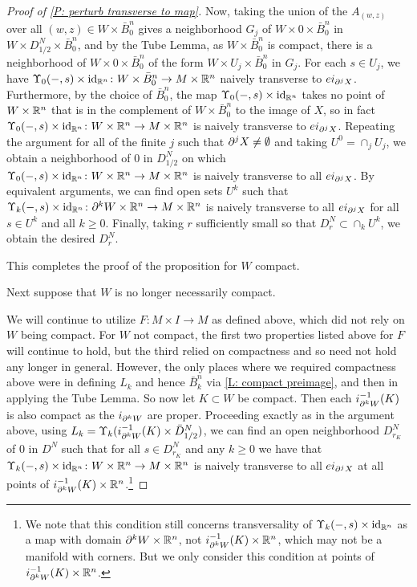 \begin{proof}[Proof of \cref{P: perturb transverse to map}]
	Now, taking the union of the $A_{(w,z)}$ over all $(w,z) \in W \times \bar B^n_0$ gives a neighborhood $G_j$ of $W \times 0 \times \bar B^n_0$ in $W \times D_{1/2}^N \times \bar B^n_0$, and by the Tube Lemma, as $W \times \bar B^n_0$ is compact, there is a neighborhood of $W \times 0 \times \bar B^n_0$ of the form $W \times U_j \times \bar B^n_0$ in $G_j$.
	For each $s \in U_j$, we have $\Upsilon_0(-,s) \times \mathrm{id}_{\mathbb{R}^n} \colon W \times \bar B^n_0 \to M \times \mathbb{R}^n$ naively transverse to $ei_{\partial^jX}$.
	Furthermore, by the choice of $\bar B^n_0$, the map $\Upsilon_0(-,s) \times \mathrm{id}_{\mathbb{R}^n}$ takes no point of $W \times \mathbb{R}^n$ that is in the complement of $W \times \bar B^n_0$ to the image of $X$,
	so in fact $\Upsilon_0(-,s) \times \mathrm{id}_{\mathbb{R}^n} \colon W \times \mathbb{R}^n \to M \times \mathbb{R}^n$ is naively transverse to $ei_{\partial^jX}$.
	Repeating the argument for all of the finite $j$ such that $\partial^jX \neq \emptyset$ and taking $U^0 = \cap_j U_j$, we obtain a neighborhood of $0$ in $D_{1/2}^N$ on which $\Upsilon_0(-,s) \times \mathrm{id}_{\mathbb{R}^n} \colon W \times \mathbb{R}^n \to M \times \mathbb{R}^n$ is naively transverse to all $ei_{\partial^jX}$.
	By equivalent arguments, we can find open sets $U^k$ such that $\Upsilon_k(-,s) \times \mathrm{id}_{\mathbb{R}^n} \colon \partial^k W \times \mathbb{R}^n \to M \times \mathbb{R}^n$ is naively transverse to all $ei_{\partial^jX}$ for all $s \in U^k$ and all $k\geq 0$.
	Finally, taking $r$ sufficiently small so that $D_r^N \subset \cap_k U^k$, we obtain the desired $D_r^N$.

	This completes the proof of the proposition for $W$ compact.

	Next suppose that $W$ is no longer necessarily compact.

	We will continue to utilize $F \colon M \times I \to M$ as defined above, which did not rely on $W$ being compact.
	For $W$ not compact, the first two properties listed above for $F$ will continue to hold, but the third relied on compactness and so need not hold any longer in general.
	However, the only places where we required compactness above were in defining $L_k$ and hence $\bar B^n_k$ via \cref{L: compact preimage}, and then in applying the Tube Lemma.
	So now let $K \subset W$ be compact.
	Then each $i_{\partial^k W}^{-1}(K)$ is also compact as the $i_{\partial^k W}$ are proper.
	Proceeding exactly as in the argument above, using $L_k = \Upsilon_k(i_{\partial^k W}^{-1}(K) \times \bar D^N_{1/2})$, we can find an open neighborhood
	$D_{r_K}^N$ of $0$ in $D^N$ such that for all $s \in D_{r_K}^N$ and any $k\geq 0$ we have that $\Upsilon_k(-,s) \times \mathrm{id}_{\mathbb{R}^n} \colon W \times \mathbb{R}^n \to M \times \mathbb{R}^n$ is naively transverse to all $ei_{\partial^j X}$ at all points of $i_{\partial^k W}^{-1}(K) \times \mathbb{R}^n$.\footnote{We note that this condition still concerns transversality of $\Upsilon_k(-,s) \times \mathrm{id}_{\mathbb{R}^n}$ as a map with domain $\partial^k W \times \mathbb{R}^n$, not $i_{\partial^k W}^{-1}(K) \times \mathbb{R}^n$, which may not be a manifold with corners. But we only consider this condition at points of $i_{\partial^k W}^{-1}(K) \times \mathbb{R}^n$.}


\end{proof}
